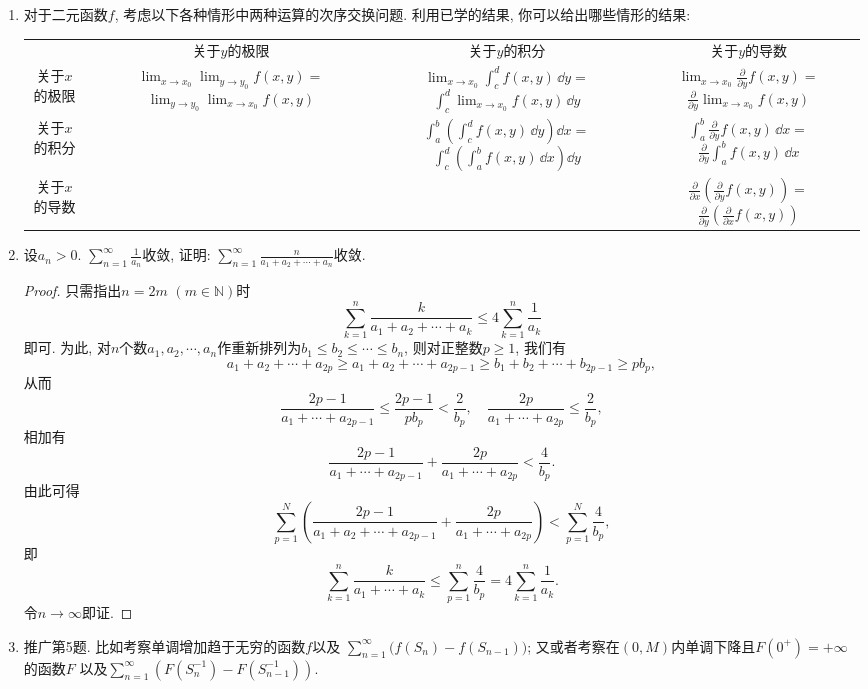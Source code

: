 \begin{quizb}
\begin{enumerate}
\begin{proof}
题中级数通项的分母\(a_n\)不能换成\(a_{n+1}\). 如取\(a_n=\ee^{n^2}\)无界, 
但\(\sum_{n=1}^{\infty}\frac{a_{n+1}-a_n}{a_{n+1}\ln a_{n+1}}\)收敛.
\end{proof}
\item 对于二元函数\(f\), 考虑以下各种情形中两种运算的次序交换问题. 
利用已学的结果, 你可以给出哪些情形的结果:
\begin{center}
\begin{tabular}{c|c|c|c}
&关于\(y\)的极限&关于\(y\)的积分&关于\(y\)的导数\\
关于\(x\)的极限&\(\lim_{x\rightarrow x_0}\lim_{y\rightarrow y_0}f(x,y)=\)
\(\lim_{y\rightarrow y_0}\lim_{x\rightarrow x_0}f(x,y)\)
&\(\lim_{x\rightarrow x_0}\int_{c}^{d}f(x,y)\,\dd y=\)
\(\int_{c}^{d}\lim_{x\rightarrow x_0}f(x,y)\,\dd y\)
&\(\lim_{x\rightarrow x_0}\frac{\partial}{\partial y}f(x,y)=\)
\(\frac{\partial}{\partial y}\lim_{x\rightarrow x_0}f(x,y)\)\\
关于\(x\)的积分& &\(\int_{a}^{b}\left(\int_{c}^{d}f(x,y)\,\dd y\right)\dd x=\)
\(\int_{c}^{d}\left(\int_{a}^{b}f(x,y)\,\dd x\right)\dd y\)
&\(\int_{a}^{b}\frac{\partial}{\partial y}f(x,y)\,\dd x=\)
\(\frac{\partial}{\partial y}\int_{a}^{b}f(x,y)\,\dd x\) \\
关于\(x\)的导数& & &\(\frac{\partial}{\partial x}\left(\frac{\partial}{\partial y}f(x,y)\right)=\)
\(\frac{\partial}{\partial y}\left(\frac{\partial}{\partial x}f(x,y)\right)\)
\end{tabular}
\end{center}
\item 设\(a_n>0\). \(\sum_{n=1}^{\infty}\frac{1}{a_n}\)收敛, 
证明: \(\sum_{n=1}^{\infty}\frac{n}{a_1+a_2+\cdots+a_n}\)收敛.
\begin{proof}
只需指出\(n=2m\) \((m\in\mathbb{N})\)时
\[\sum_{k=1}^{n}\frac{k}{a_1+a_2+\cdots+a_k}\leqslant 4\sum_{k=1}^{n}\frac{1}{a_k}\]
即可. 为此, 对\(n\)个数\(a_1,a_2,\cdots,a_n\)作重新排列为\(b_1\leqslant b_2\leqslant \cdots\leqslant b_n\), 则对正整数\(p\geqslant 1\), 我们有
\[a_1+a_2+\cdots+a_{2p}\geqslant a_1+a_2+\cdots+a_{2p-1}\geqslant b_1+b_2+\cdots+b_{2p-1}\geqslant pb_{p},\]
从而\[\frac{2p-1}{a_1+\cdots+a_{2p-1}}\leqslant \frac{2p-1}{pb_p}<\frac{2}{b_p},
\quad\frac{2p}{a_1+\cdots+a_{2p}}\leqslant\frac{2}{b_p},\]
相加有\[\frac{2p-1}{a_1+\cdots+a_{2p-1}}+\frac{2p}{a_1+\cdots+a_{2p}}<\frac{4}{b_p}.\]
由此可得
\[\sum_{p=1}^{N}\left(\frac{2p-1}{a_1+a_2+\cdots+a_{2p-1}}+\frac{2p}{a_1+\cdots+a_{2p}}\right)<\sum_{p=1}^{N}\frac{4}{b_p},\]
即\[\sum_{k=1}^{n}\frac{k}{a_1+\cdots+a_k}\leqslant\sum_{p=1}^{n}\frac{4}{b_p}=4\sum_{k=1}^{n}\frac{1}{a_k}.\]
令\(n\rightarrow\infty\)即证.
\end{proof} 
\item 推广第5题. 比如考察单调增加趋于无穷的函数\(f\)以及
\(\sum_{n=1}^{\infty}\big(f(S_n)-f(S_{n-1})\big)\); 
又或者考察在\((0,M)\)内单调下降且\(F(0^+)=+\infty\)的函数\(F\)
以及\(\sum_{n=1}^{\infty}\left(F(S_n^{-1})-F(S_{n-1}^{-1})\right)\).
\end{enumerate}
\end{quizb}

